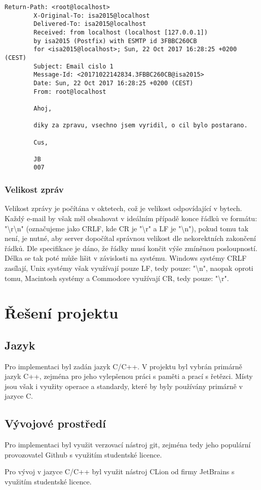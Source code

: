\documentclass[11pt,a4paper]{report}
\begin{document}
    \lstset{frameround=fttt}
    \begin{lstlisting}[frame=trBL]
        Return-Path: <root@localhost>
        X-Original-To: isa2015@localhost
        Delivered-To: isa2015@localhost
        Received: from localhost (localhost [127.0.0.1])
        by isa2015 (Postfix) with ESMTP id 3FBBC260CB
        for <isa2015@localhost>; Sun, 22 Oct 2017 16:28:25 +0200 (CEST)
        Subject: Email cislo 1
        Message-Id: <20171022142834.3FBBC260CB@isa2015>
        Date: Sun, 22 Oct 2017 16:28:25 +0200 (CEST)
        From: root@localhost

        Ahoj,

        diky za zpravu, vsechno jsem vyridil, o cil bylo postarano.

        Cus,

        JB
        007
    \end{lstlisting}

    \subsubsection{Velikost zpráv}
    \label{subsec:mailsize}
    Velikost zprávy je počítána v oktetech, což je velikost odpovídající v bytech. Každý e-mail by však měl obsahovat v ideálním případě konce řádků ve formátu: "\textbackslash r\textbackslash n" (označujeme jako CRLF, kde CR je "\textbackslash r" a LF je "\textbackslash n"), pokud tomu tak není, je nutné, aby server dopočítal správnou velikost dle nekorektních zakončení řádků. Dle specifikace je dáno, že řádky musí končit výše zmíněnou posloupností. Délka se tak poté může lišit v závislosti na systému.
    Windows systémy CRLF zasílají, Unix systémy však využívají pouze LF, tedy pouze: "\textbackslash n", naopak oproti tomu, Macintosh systémy a Commodore využívají CR, tedy pouze: "\textbackslash r".

    \clearpage
    \section{Řešení projektu}
    \subsection{Jazyk}
    Pro implementaci byl zadán jazyk C/C++. V projektu byl vybrán primárně jazyk C++, zejména pro jeho vylepšenou práci s paměti a prací s řetězci. Místy jsou však i využity operace a standardy, které by byly používány primárně v jazyce C.
    \subsection{Vývojové prostředí}
    Pro implementaci byl využit verzovací nástroj git, zejména tedy jeho populární provozovatel Github s využitím studentské licence.\par
    Pro vývoj v jazyce C/C++ byl využit nástroj CLion od firmy JetBrains s využitím studentské licence.
\end{document}
